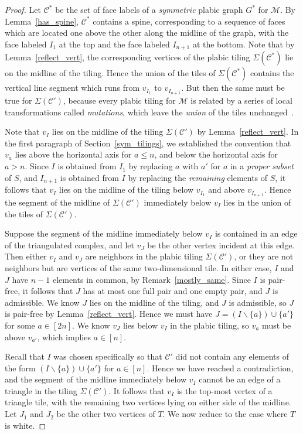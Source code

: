 \documentclass[10pt]{amsart}
\theoremstyle{definition}
\begin{document}
\begin{proof}
Let $\mathcal{C}^*$ be the set of face labels of a \emph{symmetric} plabic graph $G^*$ for $\mathcal{M}$. By Lemma~\ref{has_spine}, $\mathcal{C}^*$ contains a spine, corresponding to a sequence of faces which are located one above the other along the midline of the graph, with the face labeled $I_1$ at the top and the face labeled $I_{n+1}$ at the bottom. Note that by Lemma~\ref{reflect_vert}, the corresponding vertices of the plabic tiling $\Sigma(\mathcal{C}^*)$ lie on the midline of the tiling. Hence the union of the tiles of $\Sigma(\mathcal{C}^*)$ contains the vertical line segment which runs from $v_{I_1}$ to $v_{I_{n+1}}$. But then the same must be true for $\Sigma(\mathcal{C}')$, because every plabic tiling for $\mathcal{M}$ is related by a series of local transformations called \emph{mutations}, which leave the \emph{union} of the tiles unchanged~\cite{OPS15}. 

Note that $v_I$ lies on the midline of the tiling $\Sigma(\mathcal{C}')$ by Lemma~\ref{reflect_vert}. In the first paragraph of Section~\ref{sym_tilings}, we established the convention that $v_a$ lies above the horizontal axis for $a \leq n$, and below the horizontal axis for $a > n$. Since $I$ is obtained from $I_1$ by replacing $a$ with $a'$ for $a$ in a \emph{proper subset} of $S$, and $I_{n+1}$ is obtained from $I$ by replacing the \emph{remaining} elements of $S$, it follows that $v_I$ lies on the midline of the tiling below $v_{I_1}$ and above $v_{I_{n+1}}$. Hence the segment of the midline of $\Sigma(\mathcal{C}')$ immediately below $v_I$ lies in the union of the tiles of $\Sigma(\mathcal{C}')$.

Suppose the segment of the midline immediately below $v_I$ is contained in an edge of the triangulated complex, and let $v_J$ be the other vertex incident at this edge. Then either $v_I$ and $v_J$ are neighbors in the plabic tiling $\Sigma(\mathcal{C}')$, or they are not neighbors but are vertices of the same two-dimensional tile. In either case, $I$ and $J$ have $n-1$ elements in common, by Remark~\ref{mostly_same}. Since $I$ is pair-free, it follows that $J$ has at most one full pair and one empty pair, and $J$ is admissible. We know $J$ lies on the midline of the tiling, and $J$ is admissible, so $J$ is pair-free by Lemma~\ref{reflect_vert}. Hence we must have $J = (I \backslash \{a\}) \cup \{a'\}$ for some $a \in [2n]$. We know $v_J$ lies below $v_I$ in the plabic tiling, so $v_a$ must be above $v_{a'}$, which implies $a \in [n]$.

Recall that $I$ was chosen specifically so that $\mathcal{C}'$ did not contain any elements of the form $(I \backslash \{a\}) \cup \{a'\}$ for $a \in [n]$. Hence we have reached a contradiction, and the segment of the midline immediately below $v_I$ cannot be an edge of a triangle in the tiling $\Sigma(\mathcal{C}')$. It follows that $v_I$ is the top-most vertex of a triangle tile, with the remaining two vertices lying on either side of the midline. Let $J_1$ and $J_2$ be the other two vertices of $T$. We now reduce to the case where $T$ is white. 


\end{proof}
\end{document}

